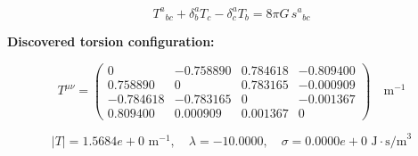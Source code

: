 
\begin{equation}
  T^a{}_{bc} + \delta^a_b T_c - \delta^a_c T_b = 8\pi G \, s^a{}_{bc}
\end{equation}

\textbf{Discovered torsion configuration:}

\begin{equation}
  T^{\mu\nu} = \begin{pmatrix}
    0 & -0.758890 & 0.784618 & -0.809400 \\
    0.758890 & 0 & 0.783165 & -0.000909 \\
    -0.784618 & -0.783165 & 0 & -0.001367 \\
    0.809400 & 0.000909 & 0.001367 & 0
  \end{pmatrix} \quad \text{m}^{-1}
\end{equation}

\begin{equation}
  |T| = 1.5684e+0 \text{ m}^{-1}, \quad
  \lambda = -10.0000, \quad
  \sigma = 0.0000e+0 \text{ J}\cdot\text{s/m}^3
\end{equation}